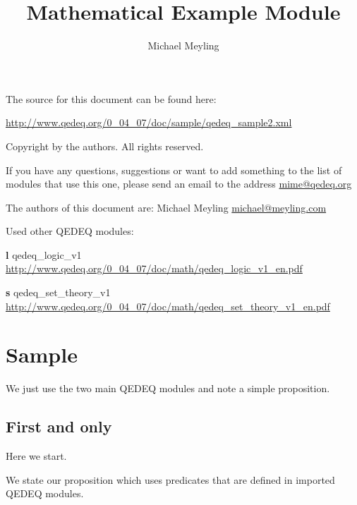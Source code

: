 \documentclass[a4paper,german,10pt,twoside]{book}
\title{Mathematical Example Module}
\author{
Michael Meyling
}
\theoremstyle{definition}
\theoremstyle{remark}
\begin{document}
\maketitle

\setlength{\parskip}{5pt plus 2pt minus 1pt}
\mbox{}
\vfill

\par
The source for this document can be found here:
\par
\url{http://www.qedeq.org/0_04_07/doc/sample/qedeq_sample2.xml}

\par
Copyright by the authors. All rights reserved.
\par
If you have any questions, suggestions or want to add something to the list of modules that use this one, please send an email to the address \href{mailto:mime@qedeq.org}{mime@qedeq.org}

\par
The authors of this document are:
Michael Meyling \href{mailto:michael@meyling.com}{michael@meyling.com}



\par
Used other QEDEQ modules:

\par


\par
\textbf{l} qedeq\_logic\_v1 \url{http://www.qedeq.org/0_04_07/doc/math/qedeq_logic_v1_en.pdf}

\par
\textbf{s} qedeq\_set\_theory\_v1 \url{http://www.qedeq.org/0_04_07/doc/math/qedeq_set_theory_v1_en.pdf}


\setlength{\parskip}{0pt}
\tableofcontents

\setlength{\parskip}{5pt plus 2pt minus 1pt}

\chapter{Sample} \label{chapter1} \hypertarget{chapter1}{}

We just use the two main QEDEQ modules and note a simple proposition.

\section{First and only} \label{chapter1_section1} \hypertarget{chapter1_section1}{}
Here we start.

\par
We state our proposition which uses predicates that are defined in imported QEDEQ modules.
\end{document}
